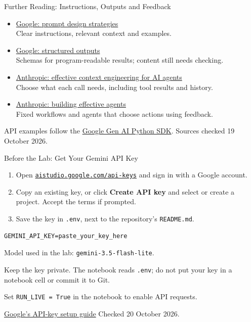 \documentclass[aspectratio=169]{beamer}
\begin{document}
\begin{frame}{Further Reading: Instructions, Outputs and Feedback}
  \begin{itemize}
    \item \href{https://ai.google.dev/gemini-api/docs/prompting-strategies}{Google: prompt design strategies}\\Clear instructions, relevant context and examples.
    \item \href{https://ai.google.dev/gemini-api/docs/structured-output}{Google: structured outputs}\\Schemas for program-readable results; content still needs checking.
    \item \href{https://www.anthropic.com/engineering/effective-context-engineering-for-ai-agents}{Anthropic: effective context engineering for AI agents}\\Choose what each call needs, including tool results and history.
    \item \href{https://www.anthropic.com/engineering/building-effective-agents}{Anthropic: building effective agents}\\Fixed workflows and agents that choose actions using feedback.
  \end{itemize}
  \small API examples follow the \href{https://github.com/googleapis/python-genai}{Google Gen AI Python SDK}. Sources checked 19 October 2026.
\end{frame}

\begin{frame}[fragile]{Before the Lab: Get Your Gemini API Key}
  \begin{enumerate}
    \item Open \href{https://aistudio.google.com/api-keys}{\texttt{aistudio.google.com/api-keys}} and sign in with a Google account.
    \item Copy an existing key, or click \textbf{Create API key} and select or create a project. Accept the terms if prompted.
    \item Save the key in \texttt{.env}, next to the repository's \texttt{README.md}.
  \end{enumerate}
\begin{lstlisting}[language={}]
GEMINI_API_KEY=paste_your_key_here
\end{lstlisting}
  Model used in the lab: \texttt{gemini-3.5-flash-lite}.
  \par\vspace{0.5em}
  \small Keep the key private. The notebook reads \texttt{.env}; do not put your key in a notebook cell or commit it to Git.
  \par\vspace{0.5em}
  Set \texttt{RUN\_LIVE = True} in the notebook to enable API requests.
  \par\vspace{0.3em}
  \footnotesize \href{https://ai.google.dev/gemini-api/docs/api-key}{Google's API-key setup guide} \hfill Checked 20 October 2026.
\end{frame}
\end{document}
